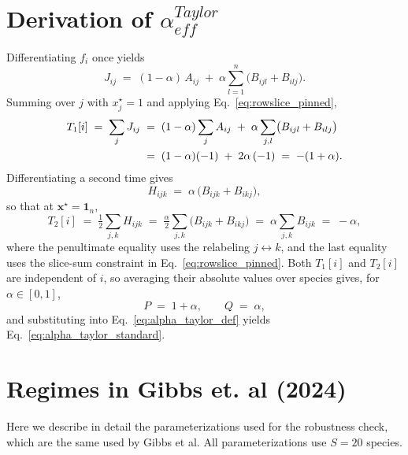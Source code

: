 \documentclass[pdflatex,sn-mathphys-num]{sn-jnl}%
\begin{document}
\begin{appendices}
\section{Derivation of $\alpha_{eff}^{Taylor}$}
Differentiating $f_i$ once yields
\begin{equation}\label{eq:J_standard}
  J_{ij} \;=\; (1-\alpha)\, A_{ij} \;+\; \alpha \sum_{l=1}^{n}\bigl(B_{ijl} + B_{ilj}\bigr).
\end{equation}
Summing over $j$ with $x^\star_j = 1$ and applying Eq.~\eqref{eq:rowslice_pinned},
\begin{align}
  T_1[i] \;=\; \sum_{j} J_{ij}
  &\;=\; (1-\alpha)\sum_{j} A_{ij} \;+\; \alpha \sum_{j,l}\bigl(B_{ijl} + B_{ilj}\bigr) \notag\\
  &\;=\; (1-\alpha)(-1) \;+\; 2\alpha\,(-1) \;=\; -(1 + \alpha).
  \label{eq:T1_standard}
\end{align}
Differentiating a second time gives
\begin{equation}
  H_{ijk} \;=\; \alpha\,\bigl(B_{ijk} + B_{ikj}\bigr),
\end{equation}
so that at $\mathbf{x}^\star = \mathbf{1}_n$,
\begin{equation}\label{eq:T2_standard}
  T_2[i] \;=\; \tfrac{1}{2}\sum_{j,k} H_{ijk}
  \;=\; \tfrac{\alpha}{2}\sum_{j,k}\bigl(B_{ijk} + B_{ikj}\bigr)
  \;=\; \alpha\sum_{j,k} B_{ijk}
  \;=\; -\alpha,
\end{equation}
where the penultimate equality uses the relabeling $j \leftrightarrow k$, and the last equality uses the slice-sum constraint in Eq.~\eqref{eq:rowslice_pinned}. Both $T_1[i]$ and $T_2[i]$ are independent of $i$, so averaging their absolute values over species gives, for $\alpha \in [0,1]$,
\begin{equation}
  P \;=\; 1 + \alpha, \qquad Q \;=\; \alpha,
\end{equation}
and substituting into Eq.~\eqref{eq:alpha_taylor_def} yields Eq.~\eqref{eq:alpha_taylor_standard}.


\section{Regimes in Gibbs et. al (2024)}
Here we describe in detail the parameterizations used for the robustness check, which are the same used by Gibbs et al. All parameterizations use $S = 20$ species.

\end{appendices}
\end{document}
